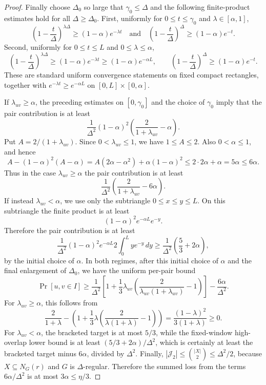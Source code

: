 \begin{proof}
Finally choose $\Delta_0$ so large that $\gamma_0\le\Delta$ and the following
finite-product estimates hold for all $\Delta\ge\Delta_0$.  First, uniformly
for $0\le t\le\gamma_0$ and $\lambda\in[\alpha,1]$,
\[
\left(1-\frac t\Delta\right)^{\lambda\Delta}
\ge (1-\alpha)e^{-\lambda t}
\quad\text{and}\quad
\left(1-\frac t\Delta\right)^\Delta\ge(1-\alpha)e^{-t}.
\]
Second, uniformly for $0\le t\le L$ and $0\le\lambda\le\alpha$,
\[
\left(1-\frac t\Delta\right)^{\lambda\Delta}
\ge (1-\alpha)e^{-\lambda t}
\ge (1-\alpha)e^{-\alpha L},
\qquad
\left(1-\frac t\Delta\right)^\Delta\ge(1-\alpha)e^{-t}.
\]
These are standard uniform convergence statements on fixed compact
rectangles, together with $e^{-\lambda t}\ge e^{-\alpha L}$ on
$[0,L]\times[0,\alpha]$.

If $\lambda_{uv}\ge\alpha$, the preceding estimates on
$[0,\gamma_0]$ and the choice of $\gamma_0$ imply that the pair contribution
is at least
\[
\frac1{\Delta^2}(1-\alpha)^2
\left(\frac{2}{1+\lambda_{uv}}-\alpha\right).
\]
Put $A=2/(1+\lambda_{uv})$.  Since $0<\lambda_{uv}\le1$, we have
$1\le A\le2$.  Also $0<\alpha\le1$, and hence
\[
A-(1-\alpha)^2(A-\alpha)
=A(2\alpha-\alpha^2)+\alpha(1-\alpha)^2
\le 2\cdot 2\alpha+\alpha=5\alpha\le6\alpha .
\]
Thus in the case $\lambda_{uv}\ge\alpha$ the pair contribution is at least
\[
\frac1{\Delta^2}
\left(\frac{2}{1+\lambda_{uv}}-6\alpha\right).
\]
If instead $\lambda_{uv}<\alpha$, we use only the
subtriangle $0\le x\le y\le L$.  On this subtriangle the finite product is at
least
\[
(1-\alpha)^2 e^{-\alpha L}e^{-y}.
\]
Therefore the pair contribution is at least
\[
\frac1{\Delta^2}(1-\alpha)^2 e^{-\alpha L}
2\int_0^L y e^{-y}\,dy
\ge \frac1{\Delta^2}\left(\frac53+2\alpha\right),
\]
by the initial choice of $\alpha$.  In both regimes, after this initial
choice of $\alpha$ and the final enlargement of $\Delta_0$, we have the
uniform per-pair bound
\[
\Pr[u,v\in I]\ge
\frac1{\Delta^2}
\left[
1+\frac13\lambda_{uv}
\left(\frac{2}{\lambda_{uv}(1+\lambda_{uv})}-1\right)
\right]
-\frac{6\alpha}{\Delta^2}.
\]
For $\lambda_{uv}\ge\alpha$, this follows from
\[
\frac{2}{1+\lambda}
-\left(1+\frac13\lambda\left(\frac{2}{\lambda(1+\lambda)}-1\right)\right)
=\frac{(1-\lambda)^2}{3(1+\lambda)}\ge0.
\]
For $\lambda_{uv}<\alpha$, the bracketed target is at most $5/3$, while the
fixed-window high-overlap lower bound is at least
$(5/3+2\alpha)/\Delta^2$, which is certainly at least the bracketed target
minus $6\alpha$, divided by $\Delta^2$.
Finally, $|\mathcal J_2|\le\binom{|X|}{2}\le\Delta^2/2$, because
$X\subseteq N_G(r)$ and $G$ is $\Delta$-regular.  Therefore the summed loss
from the terms $6\alpha/\Delta^2$ is at most $3\alpha\le\eta/3$.


\end{proof}
